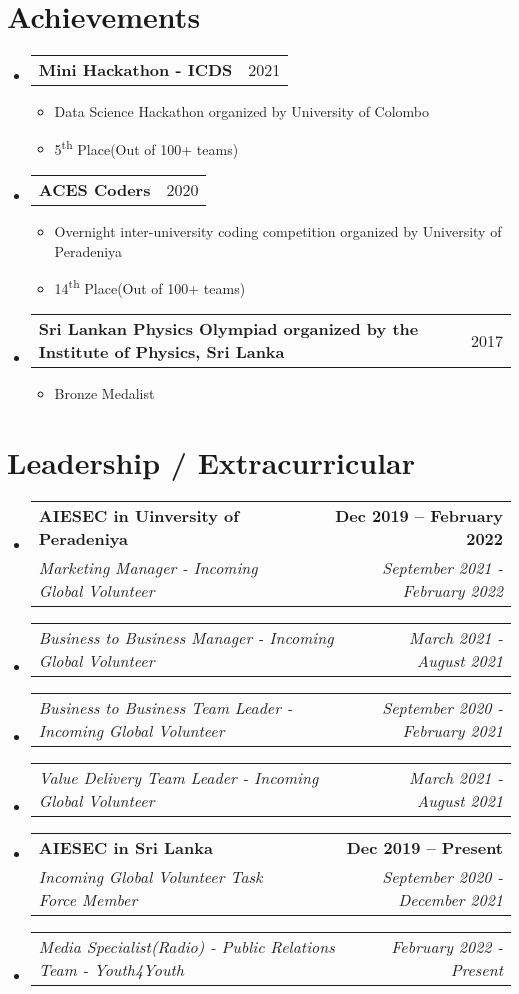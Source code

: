 \documentclass[letterpaper,11pt]{article}
\makeatletter
\newcommand{\resumeSubheading}[4]{
  \vspace{-2pt}\item
    \begin{tabular*}{1.0\textwidth}[t]{l@{\extracolsep{\fill}}r}
      \textbf{#1} & \textbf{\small #2} \\
      \textit{\small#3} & \textit{\small #4} \\
    \end{tabular*}\vspace{-7pt}
}
\newcommand{\resumeSubSubheading}[2]{
    \item
    \begin{tabular*}{1\textwidth}{l@{\extracolsep{\fill}}r}
      \textit{\small#1} & \textit{\small #2} \\
    \end{tabular*}\vspace{-7pt}
}
\newcommand{\resumeListHeading}[2]{
    \item
    \begin{tabular*}{1.001\textwidth}{l@{\extracolsep{\fill}}r}
      \small#1 & {\small #2}\\
    \end{tabular*}\vspace{-15pt}
}
\newcommand{\resumeSubHeadingListStart}{\begin{itemize}[leftmargin=0.0in, label={}]}
\newcommand{\resumeSubHeadingListEnd}{\end{itemize}}
\makeatother
\begin{document}
\section{Achievements}
    \resumeSubHeadingListStart
        \resumeListHeading{ \textbf{Mini Hackathon - ICDS} }{2021}
        \vspace*{3.0\multicolsep}
        \begin{itemize}[ itemsep=-2pt]
          \item Data Science Hackathon organized by University of Colombo
          \item 5\textsuperscript{th} Place(Out of 100+ teams)
        \end{itemize}
        \vspace{-20pt}
        \resumeListHeading{ \textbf{ACES Coders} }{2020}
        \vspace*{3.0\multicolsep}
        \begin{itemize}[ itemsep=-2pt]
          \item Overnight inter-university coding competition organized by University of Peradeniya
          \item 14\textsuperscript{th} Place(Out of 100+ teams)
        \end{itemize}
        \vspace{-20pt}
        \resumeListHeading{ \textbf{Sri Lankan Physics Olympiad organized by the Institute of Physics, Sri Lanka} }{2017}
        \vspace*{3.0\multicolsep}
        \begin{itemize}[ itemsep=-2pt]
          \item Bronze Medalist
        \end{itemize}
        
    \resumeSubHeadingListEnd
\vspace{-13pt}

\section{Leadership / Extracurricular}
    \resumeSubHeadingListStart
        \resumeSubheading{AIESEC in Uinversity of Peradeniya}{Dec 2019 -- February 2022}{Marketing Manager - Incoming Global Volunteer}{September 2021 - February 2022}
        \resumeSubSubheading{Business to Business Manager - Incoming Global Volunteer}{March 2021 - August 2021}
        \resumeSubSubheading{Business to Business Team Leader - Incoming Global Volunteer}{September 2020 - February 2021}
        \resumeSubSubheading{Value Delivery Team Leader - Incoming Global Volunteer}{March 2021 - August 2021}
        \resumeSubheading{AIESEC in Sri Lanka}{Dec 2019 -- Present}{Incoming Global Volunteer Task Force Member}{September 2020 - December 2021}
        \resumeSubSubheading{Media Specialist(Radio) - Public Relations Team - Youth4Youth}{February 2022 - Present}
    \resumeSubHeadingListEnd
    
\end{document}
